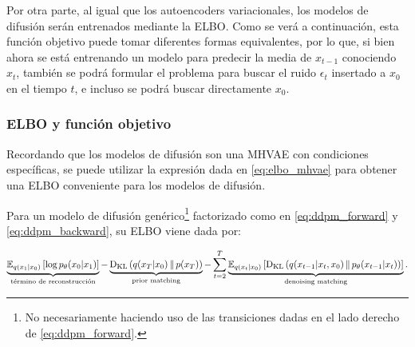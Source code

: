 Por otra parte, al igual que los autoencoders variacionales, los modelos de difusión serán entrenados mediante la ELBO. Como se verá a continuación, esta función objetivo puede tomar diferentes formas equivalentes, por lo que, si bien ahora se está entrenando un modelo para predecir la media de $x_{t-1}$ conociendo $x_t$, también se podrá formular el problema para buscar el ruido $\epsilon_t$ insertado a $x_0$ en el tiempo $t$, e incluso se podrá buscar directamente $x_0$.

\subsubsection{ELBO y función objetivo}

Recordando que los modelos de difusión son una MHVAE con condiciones específicas, se puede utilizar la expresión dada en \eqref{eq:elbo_mhvae} para obtener una ELBO conveniente para los modelos de difusión.

\begin{teo}
    \label{teo:elbo_ddpm}
    Para un modelo de difusión genérico\footnote{No necesariamente haciendo uso de las transiciones dadas en el lado derecho de \eqref{eq:ddpm_forward}.} factorizado como en \eqref{eq:ddpm_forward} y \eqref{eq:ddpm_backward}, su ELBO viene dada por:

    \begin{equation}
        \label{eq:elbo_ddpm}
        \underbrace{\mathbb{E}_{q(x_1|x_0)}\left[\log p_\theta(x_0|x_1)\right]}_{\text{término de reconstrucción}} - \underbrace{\operatorname{D_{KL}}\left(q(x_T|x_0)\,\|\,p(x_T)\right)}_{\text{prior matching}} - \sum_{t=2}^T \underbrace{\mathbb{E}_{q(x_t|x_0)}\left[\operatorname{D_{KL}}\left(q(x_{t-1}|x_t,x_0)\,\|\,p_\theta(x_{t-1}|x_t)\right)\right]}_{\text{denoising matching}}.
    \end{equation}
\end{teo}

